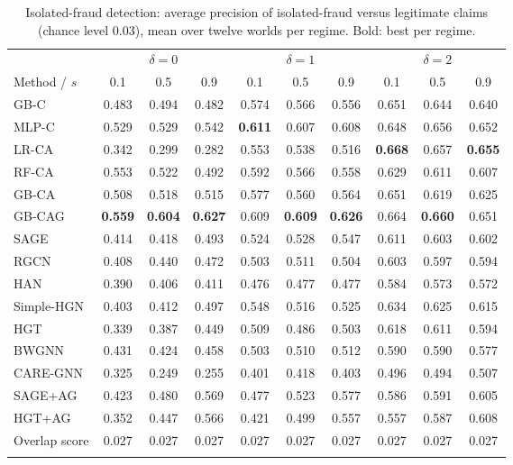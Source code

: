 \begin{table}[h]
\caption{Isolated-fraud detection: average precision of isolated-fraud versus legitimate claims (chance level 0.03), mean over twelve worlds per regime. Bold: best per regime.}\label{tab:regime_isoap}
\scriptsize
\setlength{\tabcolsep}{4pt}
\begin{tabular}{@{}lccccccccc@{}}
\toprule
 & \multicolumn{3}{c}{$\delta=0$} & \multicolumn{3}{c}{$\delta=1$} & \multicolumn{3}{c}{$\delta=2$} \\
\cmidrule(lr){2-4}\cmidrule(lr){5-7}\cmidrule(lr){8-10}
Method / $s$ & 0.1 & 0.5 & 0.9 & 0.1 & 0.5 & 0.9 & 0.1 & 0.5 & 0.9 \\
\midrule
GB-C & 0.483 & 0.494 & 0.482 & 0.574 & 0.566 & 0.556 & 0.651 & 0.644 & 0.640 \\
MLP-C & 0.529 & 0.529 & 0.542 & \textbf{0.611} & 0.607 & 0.608 & 0.648 & 0.656 & 0.652 \\
LR-CA & 0.342 & 0.299 & 0.282 & 0.553 & 0.538 & 0.516 & \textbf{0.668} & 0.657 & \textbf{0.655} \\
RF-CA & 0.553 & 0.522 & 0.492 & 0.592 & 0.566 & 0.558 & 0.629 & 0.611 & 0.607 \\
GB-CA & 0.508 & 0.518 & 0.515 & 0.577 & 0.560 & 0.564 & 0.651 & 0.619 & 0.625 \\
GB-CAG & \textbf{0.559} & \textbf{0.604} & \textbf{0.627} & 0.609 & \textbf{0.609} & \textbf{0.626} & 0.664 & \textbf{0.660} & 0.651 \\
\midrule
SAGE & 0.414 & 0.418 & 0.493 & 0.524 & 0.528 & 0.547 & 0.611 & 0.603 & 0.602 \\
RGCN & 0.408 & 0.440 & 0.472 & 0.503 & 0.511 & 0.504 & 0.603 & 0.597 & 0.594 \\
HAN & 0.390 & 0.406 & 0.411 & 0.476 & 0.477 & 0.477 & 0.584 & 0.573 & 0.572 \\
Simple-HGN & 0.403 & 0.412 & 0.497 & 0.548 & 0.516 & 0.525 & 0.634 & 0.625 & 0.615 \\
HGT & 0.339 & 0.387 & 0.449 & 0.509 & 0.486 & 0.503 & 0.618 & 0.611 & 0.594 \\
\midrule
BWGNN & 0.431 & 0.424 & 0.458 & 0.503 & 0.510 & 0.512 & 0.590 & 0.590 & 0.577 \\
CARE-GNN & 0.325 & 0.249 & 0.255 & 0.401 & 0.418 & 0.403 & 0.496 & 0.494 & 0.507 \\
\midrule
SAGE+AG & 0.423 & 0.480 & 0.569 & 0.477 & 0.523 & 0.577 & 0.586 & 0.591 & 0.605 \\
HGT+AG & 0.352 & 0.447 & 0.566 & 0.421 & 0.499 & 0.557 & 0.557 & 0.587 & 0.608 \\
Overlap score & 0.027 & 0.027 & 0.027 & 0.027 & 0.027 & 0.027 & 0.027 & 0.027 & 0.027 \\
\botrule
\end{tabular}
\end{table}